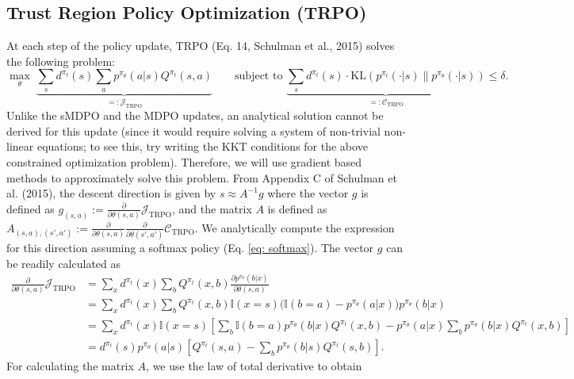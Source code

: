 \documentclass[a4paper, 10pt]{article}
\begin{document}
\subsection{Trust Region Policy Optimization (TRPO)}
At each step of the policy update, TRPO (Eq. 14, Schulman et al., 2015) solves the following problem:
\begin{equation}
  \max_\theta \; \underbrace{\sum_s d^{\pi_t}(s) \sum_a p^{\pi_\theta}(a | s) Q^{\pi_t}(s, a)}_{=: \mathcal{J}_{\text{TRPO}}} \qquad \text{subject to } \underbrace{\sum_s d^{\pi_t}(s) \cdot \text{KL}(p^{\pi_t}(\cdot | s) \| p^{\pi_\theta}(\cdot | s))}_{=: \mathcal{C}_{\text{TRPO}}} \leq \delta.  
\end{equation}
Unlike the sMDPO and the MDPO updates, an analytical solution cannot be derived for this update (since it would require solving a system of non-trivial non-linear equations; to see this, try writing the KKT conditions for the above constrained optimization problem). Therefore, we will use gradient based methods to approximately solve this problem. From Appendix C of Schulman et al. (2015), the descent direction is given by $s \approx A^{-1} g$ where the vector $g$ is defined as $g_{(s, a)} := \frac{\partial}{\partial \theta(s, a)} \mathcal{J}_{\text{TRPO}}$, and the matrix $A$ is defined as $A_{(s, a), (s', a')} := \frac{\partial}{\partial \theta(s, a)} \frac{\partial}{\partial \theta(s', a')} \mathcal{C}_{\text{TRPO}}$. We analytically compute the expression for this direction assuming a softmax policy (Eq. \ref{eq: softmax}). The vector $g$ can be readily calculated as
\begin{align}
  \frac{\partial}{\partial \theta(s, a)} \mathcal{J}_{\text{TRPO}} &= \sum_x d^{\pi_t}(x) \sum_b Q^{\pi_t}(x, b) \frac{\partial p^{\pi_\theta}(b | x)}{\partial \theta(s, a)} \nonumber \\
  &= \sum_x d^{\pi_t}(x) \sum_b Q^{\pi_t}(x, b) \mathbb{I}(x = s) \Big( \mathbb{I}(b = a) - p^{\pi_\theta}(a | x) \Big) p^{\pi_\theta}(b | x) \nonumber \\
  &= \sum_x d^{\pi_t}(x) \mathbb{I}(x = s) \left[ \sum_b \mathbb{I}(b = a) p^{\pi_\theta}(b | x) Q^{\pi_t}(x, b) - p^{\pi_\theta}(a | x) \sum_b p^{\pi_\theta}(b | x) Q^{\pi_t}(x, b) \right] \nonumber \\
  &= d^{\pi_t}(s) p^{\pi_\theta}(a | s) \left[ Q^{\pi_t}(s, a) - \sum_b p^{\pi_\theta}(b | s) Q^{\pi_t}(s, b) \right]. \label{eq: trpo_gradient}
\end{align}
For calculating the matrix $A$, we use the law of total derivative to obtain
\end{document}

